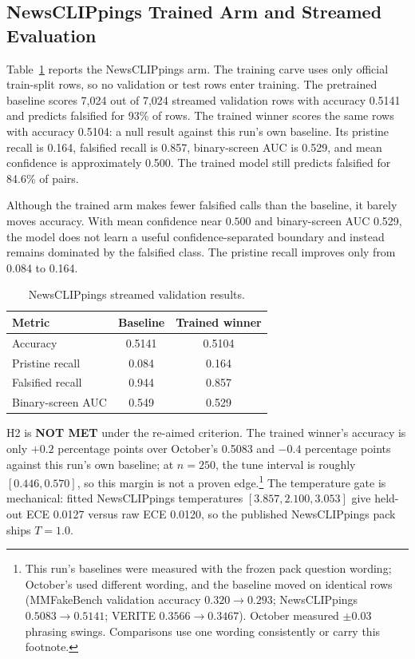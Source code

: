 \documentclass{article} %
\begin{document}
\subsection{NewsCLIPpings Trained Arm and Streamed Evaluation}
Table~\ref{tab:ncp} reports the NewsCLIPpings arm. The training carve uses only official train-split rows, so no validation or test rows enter training. The pretrained baseline scores 7,024 out of 7,024 streamed validation rows with accuracy 0.5141 and predicts falsified for 93\% of rows. The trained winner scores the same rows with accuracy 0.5104: a null result against this run's own baseline. Its pristine recall is 0.164, falsified recall is 0.857, binary-screen AUC is 0.529, and mean confidence is approximately 0.500. The trained model still predicts falsified for 84.6\% of pairs.

Although the trained arm makes fewer falsified calls than the baseline, it barely moves accuracy. With mean confidence near \(0.500\) and binary-screen AUC 0.529, the model does not learn a useful confidence-separated boundary and instead remains dominated by the falsified class. The pristine recall improves only from 0.084 to 0.164.

\begin{table}[t]
\centering
\small
\caption{NewsCLIPpings streamed validation results.}
\label{tab:ncp}
\begin{tabular}{lcc}
\toprule
Metric & Baseline & Trained winner \\
\midrule
Accuracy & 0.5141 & 0.5104 \\
Pristine recall & 0.084 & 0.164 \\
Falsified recall & 0.944 & 0.857 \\
Binary-screen AUC & 0.549 & 0.529 \\
\bottomrule
\end{tabular}
\end{table}

H2 is \textbf{NOT MET} under the re-aimed criterion. The trained winner's accuracy is only \(+0.2\) percentage points over October's 0.5083 and \(-0.4\) percentage points against this run's own baseline; at \(n=250\), the tune interval is roughly \([0.446, 0.570]\), so this margin is not a proven edge.\footnote{This run's baselines were measured with the frozen pack question wording; October's used different wording, and the baseline moved on identical rows (MMFakeBench validation accuracy \(0.320\rightarrow0.293\); NewsCLIPpings \(0.5083\rightarrow0.5141\); VERITE \(0.3566\rightarrow0.3467\)). October measured \(\pm0.03\) phrasing swings. Comparisons use one wording consistently or carry this footnote.} The temperature gate is mechanical: fitted NewsCLIPpings temperatures \([3.857, 2.100, 3.053]\) give held-out ECE 0.0127 versus raw ECE 0.0120, so the published NewsCLIPpings pack ships \(T=1.0\).
\end{document}
